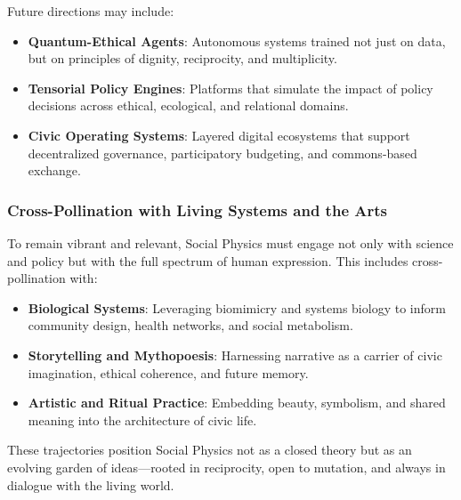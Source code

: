 \documentclass{article}
\theoremstyle{plain}
\theoremstyle{claimstyle}
\begin{document}
Future directions may include:

\begin{itemize}
    \item \textbf{Quantum-Ethical Agents}: Autonomous systems trained not just on data, but on principles of dignity, reciprocity, and multiplicity.
    \item \textbf{Tensorial Policy Engines}: Platforms that simulate the impact of policy decisions across ethical, ecological, and relational domains.
    \item \textbf{Civic Operating Systems}: Layered digital ecosystems that support decentralized governance, participatory budgeting, and commons-based exchange.
\end{itemize}

\subsubsection{Cross-Pollination with Living Systems and the Arts}

To remain vibrant and relevant, Social Physics must engage not only with science and policy but with the full spectrum of human expression. This includes cross-pollination with:

\begin{itemize}
    \item \textbf{Biological Systems}: Leveraging biomimicry and systems biology to inform community design, health networks, and social metabolism.
    \item \textbf{Storytelling and Mythopoesis}: Harnessing narrative as a carrier of civic imagination, ethical coherence, and future memory.
    \item \textbf{Artistic and Ritual Practice}: Embedding beauty, symbolism, and shared meaning into the architecture of civic life.
\end{itemize}

These trajectories position Social Physics not as a closed theory but as an evolving garden of ideas—rooted in reciprocity, open to mutation, and always in dialogue with the living world.
\end{document}
